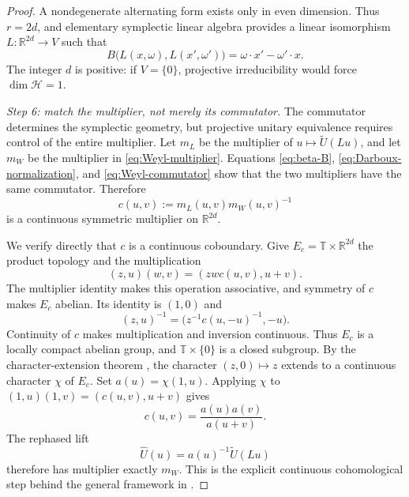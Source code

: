 \documentclass[reqno]{amsart}
\numberwithin{equation}{section}
\theoremstyle{definition}
\theoremstyle{remark}
\newcommand{\cH}{\mathcal H}
\newcommand{\R}{\mathbb R}
\newcommand{\T}{\mathbb T}
\newcommand{\Step}[1]{\par\medskip\noindent\textit{#1.}\quad}
\begin{document}
\begin{proof}
A nondegenerate alternating form exists only in even dimension.  Thus
$r=2d$, and elementary symplectic linear algebra provides a linear
isomorphism $L:\R^{2d}\to V$ such that
\begin{equation}\label{eq:Darboux-normalization}
 B\bigl(L(x,\omega),L(x',\omega')\bigr)
 =\omega\cdot x'-\omega'\cdot x.
\end{equation}
The integer $d$ is positive: if $V=\{0\}$, projective irreducibility would
force $\dim\cH=1$.

\Step{Step 6: match the multiplier, not merely its commutator}
The commutator determines the symplectic geometry, but projective unitary
equivalence requires control of the entire multiplier.  Let $m_L$ be the
multiplier of $u\mapsto\widetilde U(Lu)$, and let $m_W$ be
the multiplier in \eqref{eq:Weyl-multiplier}.  Equations
\eqref{eq:beta-B}, \eqref{eq:Darboux-normalization}, and
\eqref{eq:Weyl-commutator} show that the two multipliers have the same
commutator.  Therefore
\[
 c(u,v):=m_L(u,v)m_W(u,v)^{-1}
\]
is a continuous symmetric multiplier on $\R^{2d}$.

We verify directly that $c$ is a continuous coboundary.  Give
$E_c=\T\times\R^{2d}$ the product topology and the multiplication
\begin{equation}\label{eq:central-extension-product}
 (z,u)(w,v)=(zwc(u,v),u+v).
\end{equation}
The multiplier identity makes this operation associative, and symmetry of
$c$ makes $E_c$ abelian.  Its identity is $(1,0)$ and
\[
 (z,u)^{-1}=\bigl(z^{-1}c(u,-u)^{-1},-u\bigr).
\]
Continuity of $c$ makes multiplication and inversion continuous.  Thus
$E_c$ is a locally compact abelian group, and $\T\times\{0\}$ is a closed
subgroup.  By the character-extension theorem
\cite[Corollary~4.42]{FollandAbstract2016}, the character $(z,0)\mapsto z$
extends to a continuous character $\chi$ of $E_c$.  Set $a(u)=\chi(1,u)$.
Applying $\chi$ to $(1,u)(1,v)=(c(u,v),u+v)$ gives
\begin{equation}\label{eq:c-coboundary}
 c(u,v)=\frac{a(u)a(v)}{a(u+v)}.
\end{equation}
The rephased lift
\begin{equation}\label{eq:rephased-lift}
 \widehat U(u)=a(u)^{-1}\widetilde U(Lu)
\end{equation}
therefore has multiplier exactly $m_W$.  This is the explicit continuous
cohomological step behind the general framework in \cite{Kleppner1965}.


\end{proof}
\end{document}

